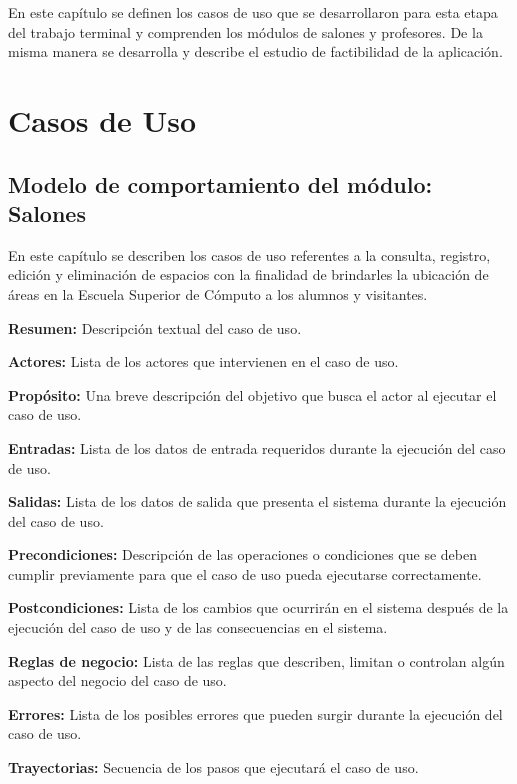 En este capítulo se definen los casos de uso que se desarrollaron para esta etapa del trabajo terminal y comprenden los módulos de salones y profesores. De la misma manera se desarrolla y describe el estudio de factibilidad de la aplicación.
\newpage
\section{Casos de Uso}


\subsection{Modelo de comportamiento del módulo:  Salones \label{chp:modeloComportamientoSalones}}
En este capítulo se describen los casos de uso referentes a la consulta, registro, edición y eliminación de espacios con la finalidad de brindarles la ubicación de áreas en la Escuela Superior de Cómputo a los alumnos y visitantes. \bigskip

\begin{objetivos}
	\item {\bf Resumen:} Descripción textual del caso de uso.
	\item {\bf Actores:} Lista de los actores que intervienen en el caso de uso.
	\item {\bf Propósito:} Una breve descripción del objetivo que busca el actor al ejecutar el caso de uso.
	\item {\bf Entradas:} Lista de los datos de entrada requeridos durante la ejecución del caso de uso.
	\item {\bf Salidas:} Lista de los datos de salida que presenta el sistema durante la ejecución del caso de uso.
	\item {\bf Precondiciones:} Descripción de las operaciones o condiciones que se deben cumplir previamente para que el caso de uso pueda ejecutarse correctamente.
	\item {\bf Postcondiciones:} Lista de los cambios que ocurrirán en el sistema después de la ejecución del caso de uso y de las consecuencias en el sistema.
	\item {\bf Reglas de negocio:} Lista de las reglas que describen, limitan o controlan algún aspecto del negocio del caso de uso.
	\item {\bf Errores:} Lista de los posibles errores que pueden surgir durante la ejecución del caso de uso.
	\item {\bf Trayectorias:} Secuencia de los pasos que ejecutará el caso de uso.
\end{objetivos}

